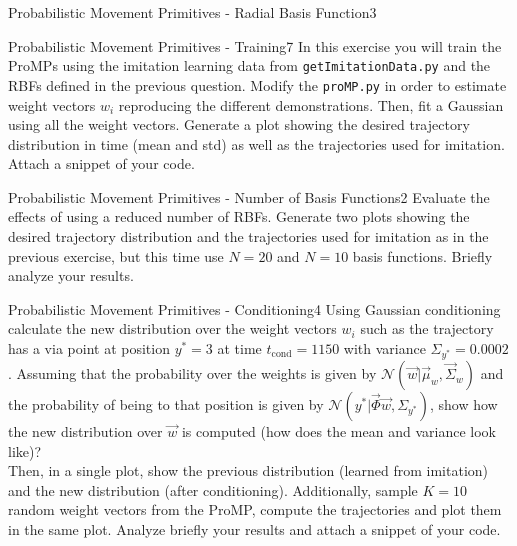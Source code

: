 \begin{questions}
\begin{question}[bonus]{Probabilistic Movement Primitives - Radial Basis Function}{3}
\begin{answer}\end{answer}
\end{question}


\begin{question}[bonus]{Probabilistic Movement Primitives - Training}{7}
In this exercise you will train the ProMPs using the imitation learning data from \texttt{getImitationData.py} and the RBFs defined in the previous question. Modify the \texttt{proMP.py} in order to estimate weight vectors $w_i$ reproducing the different demonstrations. Then, fit a Gaussian using all the weight vectors. Generate a plot showing the desired trajectory distribution in time (mean and std) as well as the trajectories used for imitation. Attach a snippet of your code.

\begin{answer}\end{answer}

\end{question}


\begin{question}[bonus]{Probabilistic Movement Primitives - Number of Basis Functions}{2}
Evaluate the effects of using a reduced number of RBFs. Generate two plots showing the desired trajectory distribution and the trajectories used for imitation as in the previous exercise, but this time use $N=20$ and $N=10$ basis functions. Briefly analyze your results.

\begin{answer}\end{answer}

\end{question}



\begin{question}[bonus]{Probabilistic Movement Primitives - Conditioning}{4}
Using Gaussian conditioning calculate the new distribution over the weight vectors $w_i$ such as the trajectory has a via point at position $y^*=3$ at time $t_\textrm{cond}=1150$ with variance $\Sigma_{y^*}=0.0002$.
Assuming that the probability over the weights is given by $\mathcal{N}(\vec w|\vec \mu_w,\vec \Sigma_w)$ and the probability of being to that position is given by $\mathcal{N}(y^*|\vec \Phi \vec w, \Sigma_{y^*} )$, show how the new distribution over $\vec w$ is computed (how does the mean and variance look like)?
\\
Then, in a single plot, show the previous distribution (learned from imitation) and the new distribution (after conditioning). Additionally, sample $K=10$ random weight vectors from the ProMP, compute the trajectories and plot them in the same plot. Analyze briefly your results and attach a snippet of your code.


\end{question}
\end{questions}
